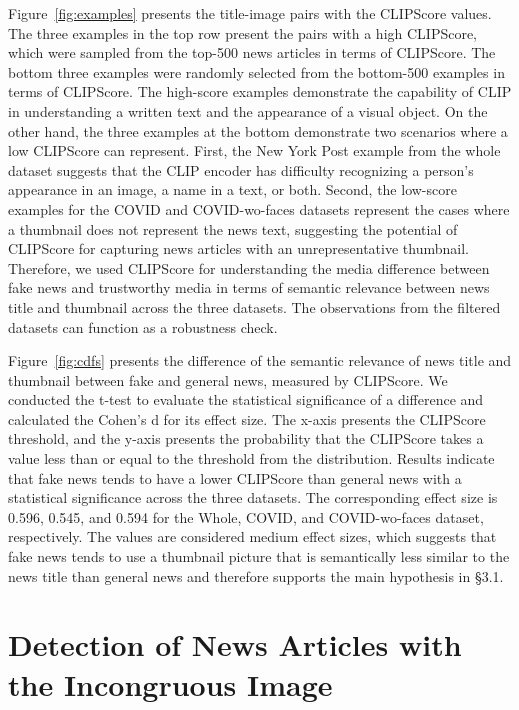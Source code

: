 \documentclass[11pt]{article}
\begin{document}
Figure~\ref{fig:examples} presents the title-image pairs with the CLIPScore values. The three examples in the top row present the pairs with a high CLIPScore, which were sampled from the top-500 news articles in terms of CLIPScore. The bottom three examples were randomly selected from the bottom-500 examples in terms of CLIPScore. The high-score examples demonstrate the capability of CLIP in understanding a written text and the appearance of a visual object. On the other hand, the three examples at the bottom demonstrate two scenarios where a low CLIPScore can represent. First, the New York Post example from the whole dataset suggests that the CLIP encoder has difficulty recognizing a person's appearance in an image, a name in a text, or both. Second, the low-score examples for the COVID and COVID-wo-faces datasets represent the cases where a thumbnail does not represent the news text, suggesting the potential of CLIPScore for capturing news articles with an unrepresentative thumbnail. Therefore, we used CLIPScore for understanding the media difference between fake news and trustworthy media in terms of semantic relevance between news title and thumbnail across the three datasets. The observations from the filtered datasets can function as a robustness check.

Figure~\ref{fig:cdfs} presents the difference of the semantic relevance of news title and thumbnail between fake and general news, measured by CLIPScore. We conducted the t-test to evaluate the statistical significance of a difference and calculated the Cohen's d for its effect size. The x-axis presents the CLIPScore threshold, and the y-axis presents the probability that the CLIPScore takes a value less than or equal to the threshold from the distribution. Results indicate that fake news tends to have a lower CLIPScore than general news with a statistical significance across the three datasets. The corresponding effect size is 0.596, 0.545, and 0.594 for the Whole, COVID, and COVID-wo-faces dataset, respectively. The values are considered medium effect sizes, which suggests that fake news tends to use a thumbnail picture that is semantically less similar to the news title than general news and therefore supports the main hypothesis in \S 3.1.

\section{Detection of News Articles with the Incongruous Image}
\end{document}
